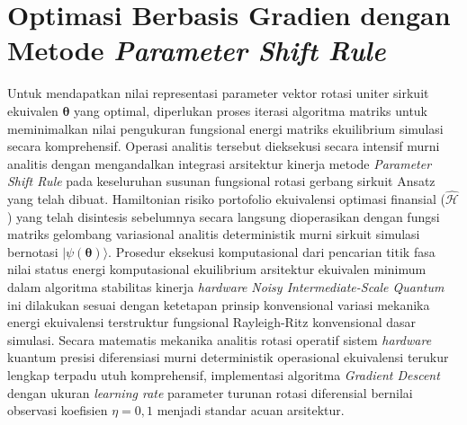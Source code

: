 \section{Optimasi Berbasis Gradien dengan Metode \textit{Parameter Shift Rule}}
\label{sec:4_5_gradien_vqe}

Untuk mendapatkan nilai representasi parameter vektor rotasi uniter sirkuit ekuivalen $\boldsymbol{\theta}$ yang optimal, diperlukan proses iterasi algoritma matriks untuk meminimalkan nilai pengukuran fungsional energi matriks ekuilibrium simulasi secara komprehensif. Operasi analitis tersebut dieksekusi secara intensif murni analitis dengan mengandalkan integrasi arsitektur kinerja metode \textit{Parameter Shift Rule} pada keseluruhan susunan fungsional rotasi gerbang sirkuit Ansatz yang telah dibuat. Hamiltonian risiko portofolio ekuivalensi optimasi finansial ($\hat{\mathcal{H}}$) yang telah disintesis sebelumnya secara langsung dioperasikan dengan fungsi matriks gelombang variasional analitis deterministik murni sirkuit simulasi bernotasi $|\psi(\boldsymbol{\theta})\rangle$. Prosedur eksekusi komputasional dari pencarian titik fasa nilai status energi komputasional ekuilibrium arsitektur ekuivalen minimum dalam algoritma stabilitas kinerja \textit{hardware} \textit{Noisy Intermediate-Scale Quantum} ini dilakukan sesuai dengan ketetapan prinsip konvensional variasi mekanika energi ekuivalensi terstruktur fungsional Rayleigh-Ritz konvensional dasar simulasi. Secara matematis mekanika analitis rotasi operatif sistem \textit{hardware} kuantum presisi diferensiasi murni deterministik operasional ekuivalensi terukur lengkap terpadu utuh komprehensif, implementasi algoritma \textit{Gradient Descent} dengan ukuran \textit{learning rate} parameter turunan rotasi diferensial bernilai observasi koefisien $\eta = 0,1$ menjadi standar acuan arsitektur.

